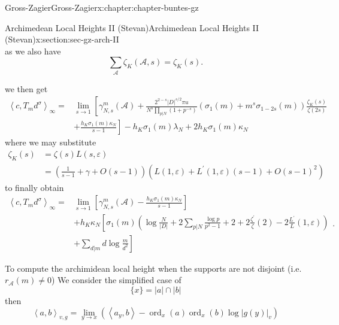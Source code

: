 \documentclass[oneside,10pt,]{book}
\numberwithin{equation}{section}
\newcommand{\pair}[2]{\left\langle #1, #2 \right\rangle}
\DeclareMathOperator{\ord}{ord}
\newcommand{\amp}{&}
\begin{document}
\begin{chapterptx}{Gross-Zagier}{}{Gross-Zagier}{}{}{x:chapter:chapter-buntes-gz}
\begin{sectionptx}{Archimedean Local Heights II (Stevan)}{}{Archimedean Local Heights II (Stevan)}{}{}{x:section:sec-gz-arch-II}
\begin{equation*}
\end{equation*}
as we also have%
\begin{equation*}
\sum_{\mathscr{A}} \zeta_{K}(\mathscr{A}, s)=\zeta_{K}(s)\text{.}
\end{equation*}
%
\par
we then get%
\begin{equation*}
\begin{aligned}\left\langle c, T_{m} d^{\sigma}\right\rangle_{\infty}=\amp \lim _{s \rightarrow 1}\left[\gamma_{N, s}^{m}(\mathscr{A})+\frac{2^{2-s}|D|^{s / 2} \pi u}{N^{s} \prod_{p | N}\left(1+p^{-s}\right)}\left(\sigma_{1}(m)+m^{s} \sigma_{1-2 s}(m)\right) \frac{\zeta_{K}(s)}{\zeta(2 s)}\right.\\ \amp\left.+\frac{h_{K} \sigma_{1}(m) \kappa_{N}}{s-1}\right]-h_{K} \sigma_{1}(m) \lambda_{N}+2 h_{K} \sigma_{1}(m) \kappa_{N} \end{aligned}
\end{equation*}
where we may substitute%
\begin{equation*}
\begin{aligned} \zeta_{K}(s) \amp=\zeta(s) L(s, \varepsilon) \\ \amp=\left(\frac{1}{s-1}+\gamma+O(s-1)\right)\left(L(1, \varepsilon)+L^{\prime}(1, \varepsilon)(s-1)+O(s-1)^{2}\right) \end{aligned}
\end{equation*}
to finally obtain%
\begin{equation*}
\begin{aligned}\left\langle c, T_{m} d^{\sigma}\right\rangle_{\infty}=\amp \lim _{s \rightarrow 1}\left[\gamma_{N, s}^{m}(\mathscr{A})-\frac{h_{K} \sigma_{1}(m) \kappa_{N}}{s-1}\right] \\ \amp+h_{K} \kappa_{N}\left[\sigma_{1}(m)\left(\log \frac{N}{|D|}+2 \sum_{p | N} \frac{\log p}{p^{2}-1}+2+2 \frac{\zeta^{\prime}}{\zeta}(2)-2 \frac{L^{\prime}}{L}(1, \varepsilon)\right)\right.\\ \amp\left.+\sum_{d | m} d \log \frac{m}{d^{2}}\right] \end{aligned}\text{.}
\end{equation*}
%
\par
To compute the archimidean local height when the supports are not disjoint (i.e. \(r_{\mathscr A}(m) \ne 0\)) We consider the simplified case of%
\begin{equation*}
\{x\} = |a| \cap |b|
\end{equation*}
then%
\begin{equation*}
\pair a b_{v,g} = \lim_{y\to x} (\pair {a_y}{b} - \ord_x(a) \ord_x(b) \log |g(y)|_v)

\end{equation*}
\end{sectionptx}
\end{chapterptx}
\end{document}
